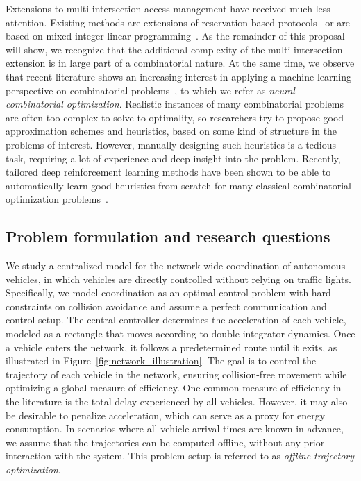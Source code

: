 \documentclass{article}
\theoremstyle{definition}
\theoremstyle{plain}
\begin{document}
Extensions to multi-intersection access management have received much less
attention. Existing methods are extensions of reservation-based protocols~\cite{hausknechtAutonomousIntersectionManagement} or
are based on mixed-integer linear programming~\cite{sartorCombinatorialLearningTraffic2019}.
As the remainder of this proposal will show, we recognize that the additional
complexity of the multi-intersection extension is in large part of a
combinatorial nature. At the same time, we observe that recent literature shows
an increasing interest in applying a machine learning perspective on
combinatorial problems~\cite{bengioMachineLearningCombinatorial2020,lodiLearningBranchingSurvey2017}, to which we refer as \textit{neural combinatorial
  optimization}. Realistic instances of many combinatorial
problems are often too complex to solve to optimality, so researchers try to
propose good approximation schemes and heuristics, based on some kind of
structure in the problems of interest. However, manually designing such
heuristics is a tedious task, requiring a lot of experience and deep insight
into the problem. Recently, tailored deep reinforcement learning methods have
been shown to be able to automatically learn good heuristics from scratch for many
classical combinatorial optimization problems~\cite{belloNeuralCombinatorialOptimization2017,koolLearningOptimizationCombinatorial,mazyavkinaReinforcementLearningCombinatorial2020,smitGraphNeuralNetworks2024}.


\subsection{Problem formulation and research questions}

We study a centralized model for the network-wide coordination of autonomous
vehicles, in which vehicles are directly controlled without relying on traffic
lights. Specifically, we model coordination as an optimal control problem with
hard constraints on collision avoidance and assume a perfect
communication and control setup. The central controller determines the
acceleration of each vehicle, modeled as a rectangle that moves according to double
integrator dynamics. Once a vehicle enters the network, it follows a predetermined route
until it exits, as illustrated in Figure~\ref{fig:network_illustration}. The
goal is to control the trajectory of each vehicle in the network, ensuring
collision-free movement while optimizing a global measure of efficiency. One
common measure of efficiency in the literature is the total delay experienced by
all vehicles. However, it may also be desirable to penalize acceleration, which
can serve as a proxy for energy consumption. In scenarios where all vehicle
arrival times are known in advance, we assume that the trajectories can be
computed offline, without any prior interaction with the system. This problem setup is
referred to as \textit{offline trajectory optimization}.
\end{document}
